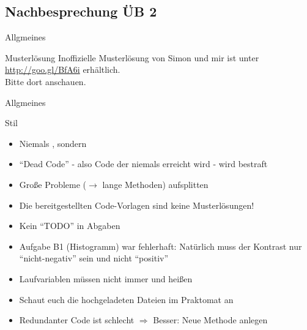 \documentclass[usepdftitle=false,hyperref={pdfpagelabels=false}]{beamer}
\begin{document}
\subsection{Nachbesprechung ÜB 2}
\begin{frame}{Allgmeines}
    \begin{block}{Musterlösung}
        Inoffizielle Musterlösung von Simon und mir ist unter 
        \href{http://goo.gl/BfA6i}{http://goo.gl/BfA6i} erhältlich.\\
        Bitte dort anschauen.
    \end{block}
\end{frame}

\begin{frame}{Allgmeines}
  \begin{block}{Stil}
    \begin{itemize}[<+->]
        \item Niemals , sondern 
        \item "`Dead Code"' - also Code der niemals erreicht wird - wird bestraft
        \item Große Probleme ($\rightarrow$ lange Methoden) aufsplitten
    \end{itemize}
  \end{block}

    \begin{itemize}[<+->]
        \item Die bereitgestellten Code-Vorlagen sind keine Musterlösungen!
        \item Kein "`TODO"' in Abgaben
        \item Aufgabe B1 (Histogramm) war fehlerhaft: Natürlich muss der Kontrast nur "`nicht-negativ"' sein und nicht "`positiv"'
        \item Laufvariablen müssen nicht immer  und  heißen
        \item Schaut euch die hochgeladeten Dateien im Praktomat an
        \item Redundanter Code ist schlecht $\Rightarrow$ Besser: Neue Methode anlegen
    \end{itemize}
\end{frame}
\end{document}
